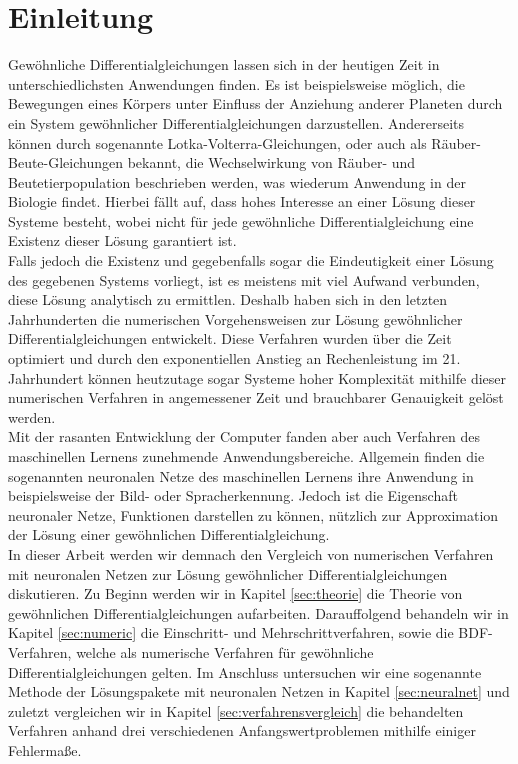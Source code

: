 \section{Einleitung}
\label{sec:einleitung}
Gewöhnliche Differentialgleichungen lassen sich in der heutigen Zeit in unterschiedlichsten Anwendungen finden.
Es ist beispielsweise möglich, die Bewegungen eines Körpers unter Einfluss der Anziehung anderer Planeten durch
ein System gewöhnlicher Differentialgleichungen darzustellen. Andererseits können durch sogenannte
Lotka-Volterra-Gleichungen, oder auch als Räuber-Beute-Gleichungen bekannt, die Wechselwirkung von Räuber- und
Beutetierpopulation beschrieben werden, was wiederum Anwendung in der Biologie findet. Hierbei fällt auf, dass hohes
Interesse an einer Lösung dieser Systeme besteht, wobei nicht für jede gewöhnliche Differentialgleichung eine Existenz
dieser Lösung garantiert ist.\\
Falls jedoch die Existenz und gegebenfalls sogar die Eindeutigkeit einer Lösung des gegebenen Systems vorliegt, ist es
meistens mit viel Aufwand verbunden, diese Lösung analytisch zu ermittlen. Deshalb haben sich in den letzten
Jahrhunderten die numerischen Vorgehensweisen zur Lösung gewöhnlicher Differentialgleichungen entwickelt.
Diese Verfahren wurden über die Zeit optimiert und durch den exponentiellen Anstieg an Rechenleistung im 21. Jahrhundert
können heutzutage sogar Systeme hoher Komplexität mithilfe dieser numerischen Verfahren in angemessener Zeit und
brauchbarer Genauigkeit gelöst werden. \\
Mit der rasanten Entwicklung der Computer fanden aber auch Verfahren des maschinellen Lernens zunehmende
Anwendungsbereiche. Allgemein finden die sogenannten neuronalen Netze des maschinellen Lernens ihre Anwendung in
beispielsweise der Bild- oder Spracherkennung. Jedoch ist die Eigenschaft neuronaler Netze, Funktionen darstellen zu
können, nützlich zur Approximation der Lösung einer gewöhnlichen Differentialgleichung. \\
In dieser Arbeit werden wir demnach den Vergleich von numerischen Verfahren mit neuronalen Netzen zur Lösung
gewöhnlicher Differentialgleichungen diskutieren. Zu Beginn werden wir in Kapitel \ref{sec:theorie} die Theorie von
gewöhnlichen Differentialgleichungen aufarbeiten. Darauffolgend behandeln wir in Kapitel \ref{sec:numeric}
die Einschritt- und Mehrschrittverfahren, sowie die BDF-Verfahren, welche als numerische Verfahren für gewöhnliche
Differentialgleichungen gelten.
Im Anschluss untersuchen wir eine sogenannte Methode der Lösungspakete mit neuronalen Netzen in
Kapitel \ref{sec:neuralnet} und zuletzt vergleichen wir in Kapitel \ref{sec:verfahrensvergleich} die behandelten
Verfahren anhand drei verschiedenen Anfangswertproblemen mithilfe einiger Fehlermaße.
\newpage

